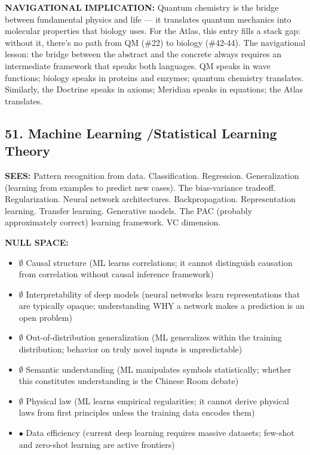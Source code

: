\textbf{NAVIGATIONAL IMPLICATION:} Quantum chemistry is the bridge between fundamental physics and life — it translates quantum mechanics into molecular properties that biology uses. For the Atlas, this entry fills a stack gap: without it, there's no path from QM (\#22) to biology (\#42-44). The navigational lesson: the bridge between the abstract and the concrete always requires an intermediate framework that speaks both languages. QM speaks in wave functions; biology speaks in proteins and enzymes; quantum chemistry translates. Similarly, the Doctrine speaks in axioms; Meridian speaks in equations; the Atlas translates.


\bigskip\noindent\makebox[\textwidth]{\color{rulegray}\rule{5cm}{0.3pt}}\bigskip


\subsection*{51. Machine Learning /\allowbreak  Statistical Learning Theory}


\textbf{SEES:} Pattern recognition from data. Classification. Regression. Generalization (learning from examples to predict new cases). The bias-variance tradeoff. Regularization. Neural network architectures. Backpropagation. Representation learning. Transfer learning. Generative models. The PAC (probably approximately correct) learning framework. VC dimension.


\textbf{NULL SPACE:}

\begin{itemize}[nosep,leftmargin=*]
  \item $\emptyset$ Causal structure (ML learns correlations; it cannot distinguish causation from correlation without causal inference framework)
  \item $\emptyset$ Interpretability of deep models (neural networks learn representations that are typically opaque; understanding WHY a network makes a prediction is an open problem)
  \item $\emptyset$ Out-of-distribution generalization (ML generalizes within the training distribution; behavior on truly novel inputs is unpredictable)
  \item $\emptyset$ Semantic understanding (ML manipulates symbols statistically; whether this constitutes understanding is the Chinese Room debate)
  \item $\emptyset$ Physical law (ML learns empirical regularities; it cannot derive physical laws from first principles unless the training data encodes them)
  \item $\bullet$ Data efficiency (current deep learning requires massive datasets; few-shot and zero-shot learning are active frontiers)
\end{itemize}


